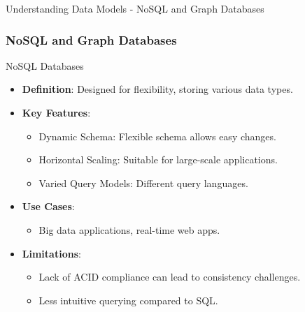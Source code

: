\documentclass[aspectratio=169]{beamer}
\begin{document}
\begin{frame}[fragile]{Understanding Data Models - NoSQL and Graph Databases}
    \frametitle{NoSQL and Graph Databases}

    \begin{block}{NoSQL Databases}
        \begin{itemize}
            \item \textbf{Definition}: Designed for flexibility, storing various data types.
            \item \textbf{Key Features}:
                \begin{itemize}
                    \item Dynamic Schema: Flexible schema allows easy changes.
                    \item Horizontal Scaling: Suitable for large-scale applications.
                    \item Varied Query Models: Different query languages.
                \end{itemize}
            \item \textbf{Use Cases}:
                \begin{itemize}
                    \item Big data applications, real-time web apps.
                \end{itemize}
            \item \textbf{Limitations}:
                \begin{itemize}
                    \item Lack of ACID compliance can lead to consistency challenges.
                    \item Less intuitive querying compared to SQL.
                \end{itemize}
        \end{itemize}
    \end{block}


\end{frame}
\end{document}
